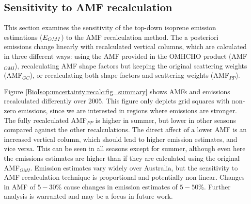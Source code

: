 
    

    \subsection{Sensitivity to AMF recalculation}
      \label{BioIsop:uncertainty:recalc}
      
      This section examines the sensitivity of the top-down isoprene emission estimations ($E_{OMI}$) to the AMF recalculation method.
      The a posteriori emissions change linearly with recalculated vertical columns, which are calculated in three different ways: using the AMF provided in the OMHCHO product (AMF$_{OMI}$), recalculating AMF shape factors but keeping the original scattering weights (AMF$_{GC}$), or recalculating both shape factors and scattering weights (AMF$_{PP}$).
      
      Figure \ref{BioIsop:uncertainty:recalc:fig_summary} shows AMFs and emissions recalculated differently over 2005.
      This figure only depicts grid squares with non-zero emissions, since we are interested in regions where emissions are stronger.
      The fully recalculated AMF$_{PP}$ is higher in summer, but lower in other seasons compared against the other recalculations.
      The direct affect of a lower AMF is an increased vertical column, which should lead to higher emission estimates, and vice versa.
      This can be seen in all seasons except for summer, although even here the emissions estimates are higher than if they are calculated using the original AMF$_{OMI}$.
      Emission estimates vary widely over Australia, but the sensitivity to AMF recalculation technique is proportional and potentially non-linear.
      Changes in AMF of $5-30\%$ cause changes in emission estimates of $5-50\%$.
      Further analysis is warranted and may be a focus in future work.
      
